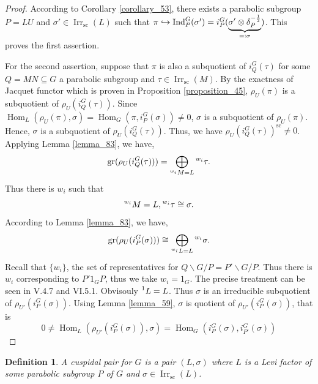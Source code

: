 \documentclass[8pt]{article}
\newtheorem{definition}{Definition}[section]
\DeclareMathOperator{\Ind}{Ind}
\DeclareMathOperator{\Hom}{Hom}
\DeclareMathOperator{\gr}{gr}
\DeclareMathOperator{\supcus}{sc}
\DeclareMathOperator{\Irr}{Irr}
\newcommand{\defqe}{=\vcentcolon}
\begin{document}
\begin{proof}
  According to Corollary \ref{corollary_53}, there exists a parabolic subgroup $P=LU$ and $\sigma'\in\Irr_{\supcus}(L)$ such that $\pi\hookrightarrow\Ind_P^G(\sigma') = i_P^G(\underbrace{\sigma'\otimes\delta_P^{-{\frac 1 2}}}_{\defqe \sigma})$. This proves the first assertion.
  \par For the second assertion, suppose that $\pi$ is also a subquotient of $i_Q^G(\tau)$ for some $Q=MN\subseteq G$ a parabolic subgroup and $\tau\in\Irr_{\supcus}(M)$. By the exactness of Jacquet functor which is proven in Proposition \ref{proposition_45}, 
  $\rho_U(\pi)$ is a subquotient of $\rho_U(i_Q^G(\tau))$. Since $\Hom_L(\rho_U(\pi),\sigma) = \Hom_G(\pi,i_P^G(\sigma))\not=0$, $\sigma$ is a subquotient of $\rho_U(\pi)$.
  Hence, $\sigma$ is a subquotient of $\rho_U(i_Q^G(\tau))$. Thus, we have $\rho_U(i_Q^G(\tau))^{\supcus}\not=0$. Applying Lemma \ref{lemma_83}, we have,
  \begin{equation*}
    \gr(\rho_U(i_Q^G(\tau))) = \bigoplus_{\prescript{w_i}{}{M} = L}\prescript{w_i}{}{\tau}.
  \end{equation*}
  Thus there is $w_i$ such that 
  \begin{equation*}
    \prescript{w_i}{}{M} = L,\prescript{w_i}{}{\tau}\cong\sigma.
  \end{equation*}
  According to Lemma \ref{lemma_83}, we have,
  \begin{equation*}
    \gr(\rho_U(i_P^G(\sigma))) \cong \bigoplus_{\prescript{w_i}{}{L} = L}\prescript{w_i}{}{\sigma}.
  \end{equation*}
  Recall that $\{w_i\}$, the set of representatives for $Q\backslash G/P = P'\backslash G/P$. Thus there is $w_i$ corresponding to $P'1_GP$, thus we take $w_i=1_G$.
  The precise treatment can be seen in \cite{Renard} V.4.7 and VI.5.1. Obvisouly $\prescript{1}{}{L} = L$. Thus $\sigma$ is an irreducible subquotient of $\rho_{U'}(i_P^G(\sigma))$.
  Using Lemma \ref{lemma_59}, $\sigma$ is quotient of $\rho_{U'}(i_P^G(\sigma))$, that is 
  \begin{equation*}
    0 \not= \Hom_L(\rho_{U'}(i_P^G(\sigma)),\sigma) = \Hom_G(i_P^G(\sigma),i_{P'}^G(\sigma))
  \end{equation*}
\end{proof}

\begin{definition}
  A cuspidal pair for $G$ is a pair $(L,\sigma)$ where $L$ is a Levi factor of some parabolic subgroup $P$ of $G$ and $\sigma\in\Irr_{\supcus}(L)$.
\end{definition}
\end{document}
